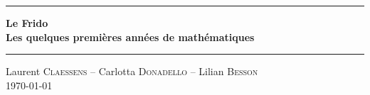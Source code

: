 

\thispagestyle{empty}
\begin{center}
  \begin{minipage}{15cm}
    \hrule\par
    \vspace{2mm}
    \begin{center}
        \Huge \bfseries Le Frido \\  {\small Les quelques premières années de mathématiques}
    \normalsize
    \end{center}
    \hrule\par
  \end{minipage}
\end{center}

\vspace{2cm}

\begin{center}
    Laurent \textsc{Claessens} -- Carlotta \textsc{Donadello} -- Lilian \textsc{Besson} \\
    \today\\
    \texttt{\GitCommitHexsha} 

    \vspace{1cm}

\end{center}

\vfill

 \LogoEtLicence

 \newpage








